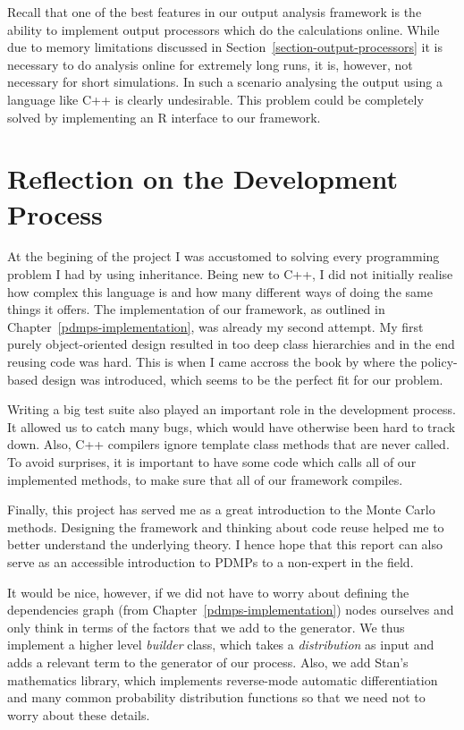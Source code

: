 \documentclass[report.tex]{subfiles}
\begin{document}
Recall that one of the best features in our output analysis framework
is the ability to implement output processors which do the calculations online.
While due to memory limitations discussed in Section~\ref{section-output-processors}
it is necessary to do analysis online for extremely long runs, it is, however,
not necessary for short simulations.
In such a scenario analysing the output using a language like C++ is clearly
undesirable.
This problem could be completely solved by implementing an R interface to our
framework.

\section{Reflection on the Development Process}

At the begining of the project I was accustomed to solving every programming problem I had
by using inheritance.
Being new to C++, I did not initially realise how complex this language is and
how many different ways of doing the same things it offers.
The implementation of our framework, as outlined in Chapter~\ref{pdmps-implementation},
was already my second attempt.
My first purely object-oriented design resulted in too deep class hierarchies
and in the end reusing code was hard.
This is when I came accross the book by \citet{alexandrescu2001modern}
where the policy-based design was introduced, which seems to be the perfect
fit for our problem.

Writing a big test suite also played an important role in the development process.
It allowed us to catch many bugs, which would have otherwise been hard to track down.
Also, C++ compilers ignore template class methods that are never called.
To avoid surprises, it is important to have some code which calls all of our implemented
methods, to make sure that all of our framework compiles.

Finally, this project has served me as a great introduction to the Monte Carlo methods.
Designing the framework and thinking about code reuse helped me to better understand
the underlying theory.
I hence hope that this report can also serve as an accessible introduction to
PDMPs to a non-expert in the field.

It would be nice, however, if we did not have to worry about defining the dependencies
graph (from Chapter~\ref{pdmps-implementation}) nodes ourselves and only think in
terms of the factors that we add to the generator.
We thus implement a higher level \textit{builder} class, which takes a \textit{distribution}
as input and adds a relevant term to the generator of our process.
Also, we add Stan's mathematics library, which implements reverse-mode automatic differentiation
and many common probability distribution functions so that we need not to worry about these
details.
\end{document}
